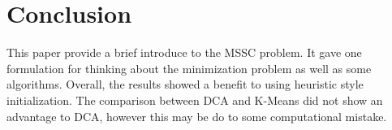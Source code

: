 \section{Conclusion}
This paper provide a brief introduce to the MSSC problem. It gave one formulation for thinking about the minimization problem as well as some algorithms. Overall, the results showed a benefit to using heuristic style initialization. The comparison between DCA and K-Means did not show an advantage to DCA, however this may be do to some computational mistake.
